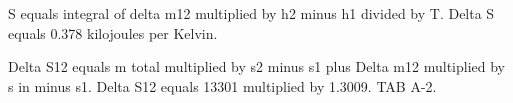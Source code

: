S equals integral of delta m12 multiplied by h2 minus h1 divided by T.  
Delta S equals 0.378 kilojoules per Kelvin.

Delta S12 equals m total multiplied by s2 minus s1 plus Delta m12 multiplied by s in minus s1.  
Delta S12 equals 13301 multiplied by 1.3009.  
TAB A-2.